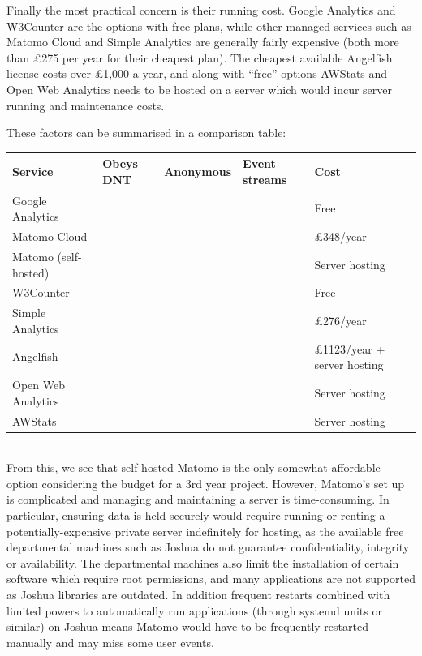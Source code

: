 \documentclass[a4paper,fleqn,twoside,12pt]{report}
\newcommand{\cmark}{\ding{51}}
\newcommand{\xmark}{\ding{55}}
\begin{document}
Finally the most practical concern is their running cost. Google Analytics and W3Counter are the options with free plans, while other managed services such as Matomo Cloud and Simple Analytics are generally fairly expensive (both more than £275 per year for their cheapest plan). The cheapest available Angelfish license costs over £1,000 a year, and along with “free” options AWStats and Open Web Analytics needs to be hosted on a server which would incur server running and maintenance costs.

These factors can be summarised in a comparison table:

\begin{adjustbox}{center}\begin{tabular}{ |l|l|l|l|l| }
  \hline
  \textbf{Service} & \textbf{Obeys DNT} & \textbf{Anonymous} & \textbf{Event streams} & \textbf{Cost} \\
  \hline
  Google Analytics & \xmark & \xmark & \xmark & Free \\
  \hline
  Matomo Cloud & \cmark & \cmark & \cmark & £348/year \\
  \hline
  Matomo (self-hosted) & \cmark & \cmark & \cmark & Server hosting \\
  \hline
  W3Counter & \xmark & \xmark & \cmark & Free \\
  \hline
  Simple Analytics & \cmark & \cmark & \cmark & £276/year \\
  \hline
  Angelfish & \xmark & \xmark & \cmark & £1123/year + server hosting \\
  \hline
  Open Web Analytics & \xmark & \xmark & \cmark & Server hosting \\
  \hline
  AWStats & \xmark & \xmark & \xmark & Server hosting \\
  \hline
\end{tabular}\end{adjustbox}\\

From this, we see that self-hosted Matomo is the only somewhat affordable option considering the budget for a 3rd year project. However, Matomo’s set up is complicated and managing and maintaining a server is time-consuming. In particular, ensuring data is held securely would require running or renting a potentially-expensive private server indefinitely for hosting, as the available free departmental machines such as Joshua do not guarantee confidentiality, integrity or availability. The departmental machines also limit the installation of certain software which require root permissions, and many applications are not supported as Joshua libraries are outdated. In addition frequent restarts combined with limited powers to automatically run applications (through systemd units or similar) on Joshua means Matomo would have to be frequently restarted manually and may miss some user events.
\end{document}
